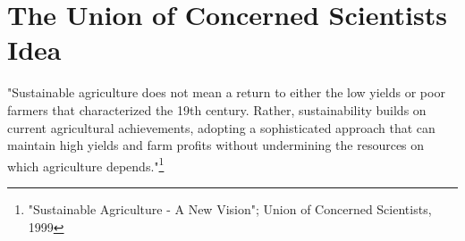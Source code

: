 \section{The Union of Concerned Scientists Idea}
\noindent "Sustainable agriculture does not mean a return to either the low yields or poor farmers that characterized the 19th century. Rather, sustainability builds on current agricultural achievements, adopting a sophisticated approach that can maintain high yields and farm profits without undermining the resources on which agriculture depends."\footnote{"Sustainable Agriculture - A New Vision"; Union of Concerned Scientists, 1999}  




